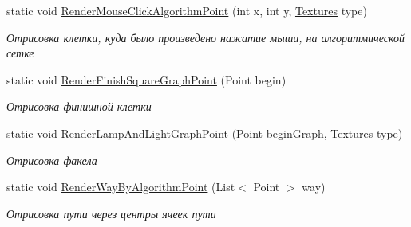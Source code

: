\begin{DoxyCompactItemize}
static void \hyperlink{class_game_1_1_extension_1_1_game_rendering_af93650c68c4abc9f2c023a62126ed1b8}{Render\+Mouse\+Click\+Algorithm\+Point} (int x, int y, \hyperlink{namespace_game_1_1_enums_a2d1ea7762a7b4609383b4b578d1c4a60}{Textures} type)
\begin{DoxyCompactList}\small\item\em Отрисовка клетки, куда было произведено нажатие мыши, на алгоритмической сетке \end{DoxyCompactList}\item 
static void \hyperlink{class_game_1_1_extension_1_1_game_rendering_a7bffef7924763d901c2890f3dce4c99e}{Render\+Finish\+Square\+Graph\+Point} (Point begin)
\begin{DoxyCompactList}\small\item\em Отрисовка финишной клетки \end{DoxyCompactList}\item 
static void \hyperlink{class_game_1_1_extension_1_1_game_rendering_a23b03c4bb880b092b0834aa5bca2715b}{Render\+Lamp\+And\+Light\+Graph\+Point} (Point begin\+Graph, \hyperlink{namespace_game_1_1_enums_a2d1ea7762a7b4609383b4b578d1c4a60}{Textures} type)
\begin{DoxyCompactList}\small\item\em Отрисовка факела \end{DoxyCompactList}\item 
static void \hyperlink{class_game_1_1_extension_1_1_game_rendering_ab1c58442dbdfc4014074c223980fb528}{Render\+Way\+By\+Algorithm\+Point} (List$<$ Point $>$ way)
\begin{DoxyCompactList}\small\item\em Отрисовка пути через центры ячеек пути \end{DoxyCompactList}\end{DoxyCompactItemize}
